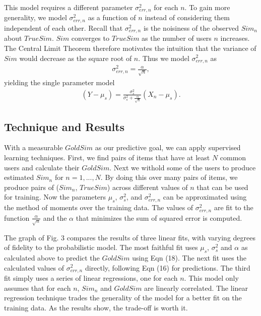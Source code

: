 \documentclass[11pt]{article}
\begin{document}
This model requires a different parameter $\sigma_{err,n}^2$ for each $n$.  To
gain more generality, we model $\sigma_{err,n}^2$ as a function of $n$ instead
of considering them independent of each other. Recall that $\sigma_{err,n}^2$ is
the noisiness of the observed $Sim_n$ about $TrueSim$.  $Sim$ converges to
$TrueSim$ as the number of users $n$ increases.  The Central Limit Theorem
therefore motivates the intuition that the variance of $Sim$ would decrease as
the square root of $n$. Thus we model $\sigma_{err,n}^2$ as
\begin{align}
\sigma_{err,n}^2 = \frac{\alpha}{\sqrt{n}},
\end{align}
yielding the single parameter model
\begin{align}
\left(Y - \mu_s\right) = \frac{\sigma_{s}^2}{\sigma_{s}^2+\frac{\alpha}{\sqrt{n}}}
\left(X_n-\mu_s\right).
\end{align}


\subsection*{Technique and Results}
With a measurable $GoldSim$ as our predictive goal, we can apply supervised 
learning techniques. First, we find pairs of items that have at least $N$ common
users and calculate their $GoldSim$. Next we withold some of the users to 
produce estimated $Sim_n$ for $n=1,...,N$. By doing this over many pairs of 
items, we produce pairs of ($Sim_n$, $TrueSim$) across different values of $n$ 
that can be used for training. Now the parameters $\mu_s$, $\sigma_{s}^2$, and 
$\sigma_{err,n}^2$ can be approximated using the method of moments over the 
training data. The values of $\sigma_{err,n}^2$ are fit to the function 
$\frac{\alpha}{\sqrt{n}}$ and the $\alpha$ that minimizes the sum of squared 
error is computed.

The graph of Fig. 3 compares the results of three linear fits, with varying
degrees of fidelity to the probabilistic model. The most faithful fit uses
$\mu_s$, $\sigma_{s}^2$ and $\alpha$ as calculated above to predict the $GoldSim$
using Eqn (18). The next fit uses the calculated values of $\sigma_{err,n}^2$
directly, following Eqn (16) for predictions. The third fit simply uses a series
of linear regressions, one for each $n$. This model only assumes that for each
$n$, $Sim_n$ and $GoldSim$ are linearly correlated. The linear regression
technique trades the generality of the model for a better fit on the training
data.  As the results show, the trade-off is worth it.
\end{document}
